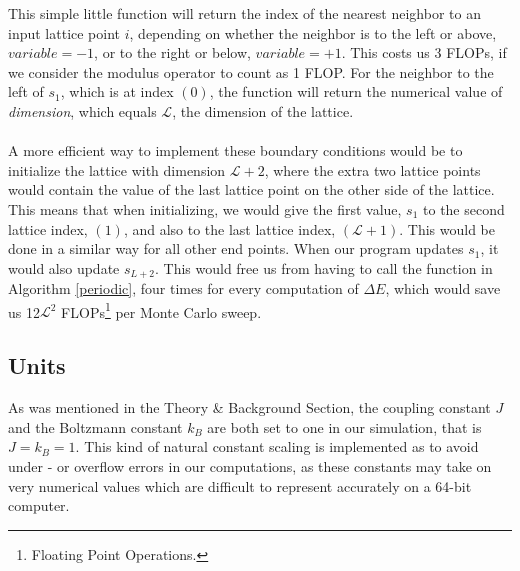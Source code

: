 This simple little function will return the index of the nearest neighbor to an input lattice point $i$, depending on whether the neighbor is to the left or above, $variable = -1$, or to the right or below, $variable = +1$. This costs us 3 FLOPs, if we consider the modulus operator to count as 1 FLOP. For the neighbor to the left of $s_1$, which is at index $(0)$, the function will return the numerical value of \textit{dimension}, which equals $\mathcal{L}$, the dimension of the lattice. \\ \\
A more efficient way to implement these boundary conditions would be to initialize the lattice with dimension $\mathcal{L} + 2$, where the extra two lattice points would contain the value of the last lattice point on the other side of the lattice. This means that when initializing, we would give the first value, $s_1$ to the second lattice index, $(1)$, and also to the last lattice index, $(\mathcal{L}+1)$. This would be done in a similar way for all other end points. When our program updates $s_1$, it would also update $s_{L+2}$. This would free us from having to call the function in Algorithm \ref{periodic}, four times for every computation of $\Delta E$, which would save us 12$\mathcal{L}^2$ FLOPs\footnote{Floating Point Operations.} per Monte Carlo sweep.

\subsection{Units}
As was mentioned in the Theory \& Background Section, the coupling constant $J$ and the Boltzmann constant $k_B$ are both set to one in our simulation, that is $J = k_B = 1$. This kind of natural constant scaling is implemented as to avoid under - or overflow errors in our computations, as these constants may take on very numerical values which are difficult to represent accurately on a 64-bit computer. 

